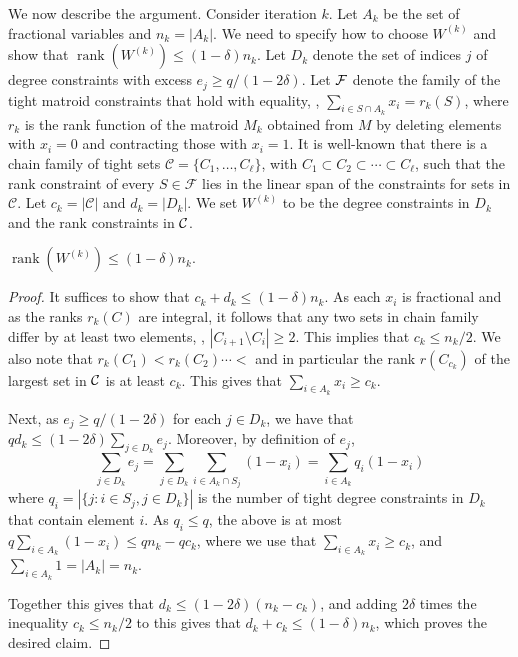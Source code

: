 \documentclass{toc}
\newcommand{\rank}{\operatorname{rank}}
\begin{document}
We now describe the argument. Consider iteration $k$. Let $A_k$ be the set of fractional variables and $n_k=|A_k|$. We need to specify how to choose $W^{(k)}$ and show that $\rank(W^{(k)}) \leq (1-\delta)n_k$.
Let $D_k$ denote the set of indices $j$ of degree constraints with excess $e_j \geq  q/(1-2\delta)$.
Let $\cal{F}$ denote the family of the tight matroid constraints that hold with equality, \ie, $\sum_{i \in S \cap A_k} x_i = r_k(S)$, where $r_k$ is the rank function of the matroid $M_k$ obtained from $M$ by deleting elements with $x_i=0$ and contracting those with $x_i=1$.
It is well-known \cite{schrijver-book-b} that there is a chain family of tight sets $\mathcal{C} = \{C_1,\ldots,C_{\ell}\}$, with  $C_1 \subset C_2 \subset \cdots \subset  C_{\ell}$,
such that the rank constraint of every $S \in \mathcal{F}$
lies in the linear span of the constraints for sets in $\mathcal{C}$.  Let $c_k = |\mathcal{C}|$ and $d_k=|D_k|$. We set $W^{(k)}$ to be the degree constraints in $D_k$ and the rank constraints in $\cal{C}$.

\begin{claim}
$\rank(W^{(k)}) \leq (1-\delta) n_k.$
\end{claim}
\begin{proof}
It suffices to show that $c_k + d_k \leq (1-\delta) n_k$.
As each $x_i$ is fractional and as the ranks $r_k(C)$ are integral, it follows that any two sets in chain family differ by at least two elements, \ie, $|C_{i+1}\setminus C_i | \geq 2$.
 This implies that  $c_k \leq n_k/2$.  We also note that $r_k(C_1) < r_k(C_2) \cdots <$ and in particular the rank $r(C_{c_k})$ of the largest set in $\cal{C}$ is at least $c_k$. This gives that $ \sum_{i \in A_k} x_i \geq c_k$.

 Next, as $e_j \geq q/(1-2\delta)$ for each $j \in D_k$, we have that $q d_k   \leq  (1-2 \delta)  \sum_{j \in D_k}  e_j$.
Moreover, by definition of $e_j$,
\[ \sum_{j \in D_k}  e_j  =   \sum_{j \in D_k} \sum_{i \in A_k \cap S_j}  (1-x_i)   = \sum_{i \in A_k}  q_i(1-x_i) \]
where  $q_i = |\{j: i\in S_j, j \in D_k \}|$ is the number of tight degree constraints in $D_k$ that contain element $i$.
As $q_i \leq q$, the above is at most $q \sum_{i \in A_k} (1-x_i)  \leq q n_k - q c_k$,
where we use that  $\sum_{i \in A_k} x_i \geq c_k$, and $\sum_{i \in A_k} 1 = |A_k|=n_k$.

Together this gives that $d_k \leq  (1-2\delta)  (n_k-c_k)$, and adding $2\delta$ times the inequality $c_k \leq n_k/2$  to this gives that $d_k +  c_k \leq  (1-\delta) n_k$, which proves the desired claim.
\end{proof}
\end{document}
